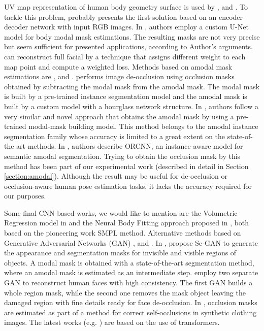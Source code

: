 \documentclass[]{interact}
\theoremstyle{plain}%
\theoremstyle{definition}
\theoremstyle{remark}
\begin{document}
UV map representation of human body geometry surface is used by \citep{yao2019densebody}, \citep{OccShapePose} and \citep{feng2018joint}. To tackle this problem, probably presents the first solution based on an encoder-decoder network with input RGB images. In \citep{OccShapePose}, authors employ a custom U-Net model for body modal mask estimations. The resulting masks are not very precise but seem sufficient for presented applications, according to Author's arguments. \citep{feng2018joint} can reconstruct full facial by a technique that assigns different weight to each map point and compute a weighted loss. Methods based on amodal mask estimations are \citep{sym14030531}, \citep{AHPdataset} and \citep{orcnn}. \citep{sym14030531} performs image de-occlusion using occlusion masks obtained by subtracting the modal mask from the amodal mask. The modal mask is built by a pre-trained instance segmentation model and the amodal mask is built by a custom model with a hourglass network structure. In \citep{AHPdataset}, authors follow a very similar and novel approach that obtains the amodal mask by using a pre-trained   modal-mask building model. This method belongs to the amodal instance segmentation family whose accuracy is limited to a great extent on the state-of-the art methods. In \citep{orcnn}, authors describe ORCNN, an instance-aware model for semantic amodal segmentation. Trying to obtain the occlusion mask by this method has been part of our experimental work (described in detail in Section \ref{section:amodal}).  Although the result may be useful for de-occlusion or occlusion-aware human pose estimation tasks, it lacks the accuracy required for our purposes. 

Some final CNN-based works, we would like to mention are the Volumetric Regression model in \citep{jackson20183d} and the Neural Body Fitting approach proposed in \citep{omran2018neural}, both based on the pioneering work SMPL method. Alternative methods based on Generative Adversarial Networks (GAN) \citep{SeGAN}, \citep{AFD} and \citep{yang2023}. In \citep{SeGAN}, propose Se-GAN to generate the appearance and segmentation masks for invisible and visible regions of objects. A modal mask is obtained with a state-of-the-art segmentation method, where an amodal mask is estimated as an intermediate step. \citep{AFD} employ two separate GAN to reconstruct human faces with high consistency. The first GAN builds a whole region mask, while the second one removes the mask object leaving the damaged region with fine details ready for face de-occlusion. In \citep{yang2023}, occlusion masks are estimated as part of a method for correct self-occlusions in synthetic clothing images. {\color{blue}The latest works (e.g. \citep{jain2023oneformer}) are  based on the use of transformers.}
\end{document}

